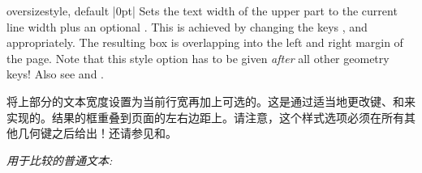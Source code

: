 \begin{docTcbKey}{oversize}{}{style, default |0pt|}
Sets the text width of the upper part to the current line width plus an
optional .
This is achieved by changing the keys 
, and
 appropriately.
The resulting box is overlapping into the left and right margin of
the page.
Note that this style option has to be given \emph{after} all other
geometry keys!
Also see  and .

将上部分的文本宽度设置为当前行宽再加上可选的。这是通过适当地更改键、和来实现的。结果的框重叠到页面的左右边距上。请注意，这个样式选项必须在所有其他几何键之后给出！还请参见和。

\begin{dispListing}

\textit{用于比较的普通文本:}\\
\lipsum[2]

\begin{tcolorbox}[oversize,title=Oversized box]
\lipsum[2]
\end{tcolorbox}

\begin{tcolorbox}[title=Normal box]
\lipsum[2]
\end{tcolorbox}
\end{dispListing}
\end{docTcbKey}

{\tcbusetemp}

  
